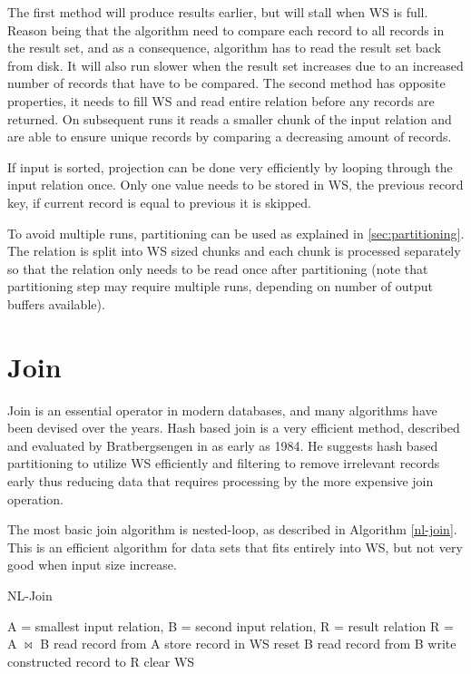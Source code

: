 The first method will produce results earlier, but will stall when WS
is full. Reason being that the algorithm need to compare each record
to all records in the result set, and as a consequence, algorithm has
to read the result set back from disk. It will also run slower when
the result set increases due to an increased number of records that
have to be compared. The second method has opposite properties, it
needs to fill WS and read entire relation before any records are
returned. On subsequent runs it reads a smaller chunk of the input
relation and are able to ensure unique records by comparing a
decreasing amount of records.

If input is sorted, projection can be done very efficiently by looping
through the input relation once. Only one value needs to be stored in
WS, the previous record key, if current record is equal to previous it
is skipped.

To avoid multiple runs, partitioning can be used as explained in
\ref{sec:partitioning}. The relation is split into WS sized chunks and
each chunk is processed separately so that the relation only needs to
be read once after partitioning (note that partitioning step may
require multiple runs, depending on number of output buffers
available).

\section{Join} 

Join is an essential operator in modern databases, and many algorithms
have been devised over the years. Hash based join is a very efficient
method, described and evaluated by Bratbergsengen in \cite{relhash} as
early as 1984. He suggests hash based partitioning to utilize WS
efficiently and filtering to remove irrelevant records early thus
reducing data that requires processing by the more expensive join
operation.

The most basic join algorithm is nested-loop, as described in
Algorithm \ref{nl-join}. This is an efficient algorithm for data sets
that fits entirely into WS, but not very good when input size
increase.

\begin{algorithm}[H]
	\caption{NL-Join}
	\label{nl-join}
	\begin{algorithmic}
		\REQUIRE A = smallest input relation, B = second input
		relation, R = result relation
		\ENSURE R = A $\bowtie$ B
			\STATE read record from A
			\STATE store record in WS
		\ENDWHILE
		\STATE reset B
			\STATE read record from B
				\STATE write constructed record to R
			\ENDFOR
		\ENDWHILE
		\STATE clear WS
	\end{algorithmic}
\end{algorithm}

